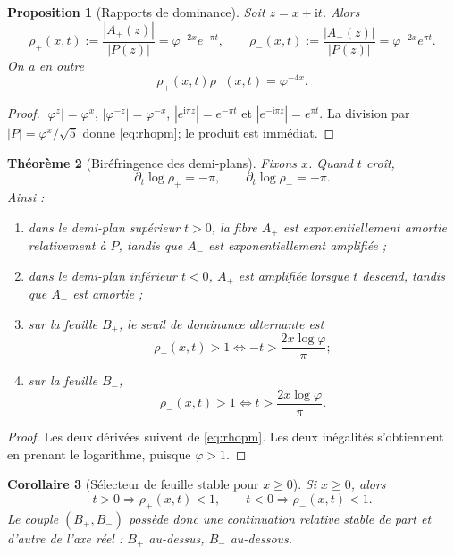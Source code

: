 \documentclass[11pt,a4paper]{article}
\newtheorem{theorem}{Théorème}[section]
\newtheorem{proposition}[theorem]{Proposition}
\newtheorem{corollary}[theorem]{Corollaire}
\newcommand{\ii}{\mathrm i}
\newcommand{\ph}{\varphi}
\begin{document}
\begin{proposition}[Rapports de dominance]\label{prop:rho}
Soit $z=x+\ii t$. Alors
\begin{equation}\label{eq:rhopm}
 \rho_+(x,t):=\frac{|A_+(z)|}{|P(z)|}=\ph^{-2x}e^{-\pi t},
 \qquad
 \rho_-(x,t):=\frac{|A_-(z)|}{|P(z)|}=\ph^{-2x}e^{\pi t}.
\end{equation}
On a en outre
\[
 \rho_+(x,t)\rho_-(x,t)=\ph^{-4x}.
\]
\end{proposition}

\begin{proof}
$|\ph^z|=\ph^x$, $|\ph^{-z}|=\ph^{-x}$,
$|e^{\ii\pi z}|=e^{-\pi t}$ et $|e^{-\ii\pi z}|=e^{\pi t}$. La division par $|P|=\ph^x/\sqrt5$ donne \eqref{eq:rhopm}; le produit est immédiat.
\end{proof}

\begin{theorem}[Biréfringence des demi-plans]\label{thm:halfplanes}
Fixons $x$. Quand $t$ croît,
\[
 \partial_t\log\rho_+=-\pi,\qquad
 \partial_t\log\rho_-=+\pi.
\]
Ainsi :
\begin{enumerate}[label=\textup{(\roman*)}]
\item dans le demi-plan supérieur $t>0$, la fibre $A_+$ est exponentiellement amortie relativement à $P$, tandis que $A_-$ est exponentiellement amplifiée ;
\item dans le demi-plan inférieur $t<0$, $A_+$ est amplifiée lorsque $t$ descend, tandis que $A_-$ est amortie ;
\item sur la feuille $B_+$, le seuil de dominance alternante est
\begin{equation}\label{eq:thresholdplus}
 \rho_+(x,t)>1
 \iff
 -t>\frac{2x\log\ph}{\pi};
\end{equation}
\item sur la feuille $B_-$,
\[
 \rho_-(x,t)>1
 \iff
 t>\frac{2x\log\ph}{\pi}.
\]
\end{enumerate}
\end{theorem}

\begin{proof}
Les deux dérivées suivent de \eqref{eq:rhopm}. Les deux inégalités s'obtiennent en prenant le logarithme, puisque $\ph>1$.
\end{proof}

\begin{corollary}[Sélecteur de feuille stable pour $x\ge0$]
Si $x\ge0$, alors
\[
 t>0\Longrightarrow \rho_+(x,t)<1,
 \qquad
 t<0\Longrightarrow \rho_-(x,t)<1.
\]
Le couple $(B_+,B_-)$ possède donc une continuation relative stable de part et d'autre de l'axe réel : $B_+$ au-dessus, $B_-$ au-dessous.
\end{corollary}
\end{document}
